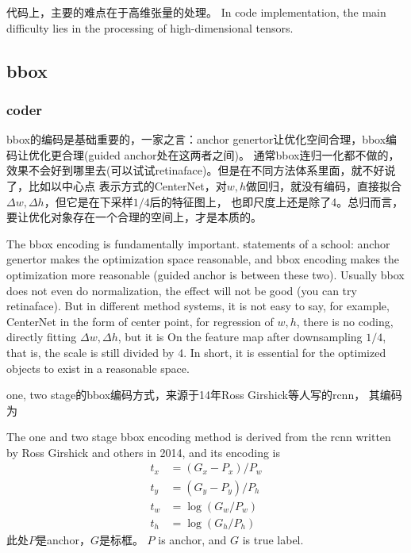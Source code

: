 \documentclass[UTF8]{ctexart}
\begin{document}
代码上，主要的难点在于高维张量的处理。
In code implementation, the main difficulty lies in the processing of high-dimensional tensors.

\subsection{bbox}

\subsubsection{coder}
bbox的编码是基础重要的，一家之言：anchor genertor让优化空间合理，bbox编码让优化更合理(guided anchor处在这两者之间)。
通常bbox连归一化都不做的，效果不会好到哪里去(可以试试retinaface)。但是在不同方法体系里面，就不好说了，比如以中心点
表示方式的CenterNet，对$w, h$做回归，就没有编码，直接拟合$\Delta w, \Delta h$，但它是在下采样$1/4$后的特征图上，
也即尺度上还是除了4。总归而言，要让优化对象存在一个合理的空间上，才是本质的。

The bbox encoding is fundamentally important. statements of a school: anchor genertor makes the optimization space 
reasonable, and bbox encoding makes the optimization more reasonable (guided anchor is between these two). 
Usually bbox does not even do normalization, the effect will not be good (you can try retinaface). 
But in different method systems, it is not easy to say, for example, CenterNet in the form of center point, 
for regression of $w, h$, there is no coding, directly fitting $\Delta w, \Delta h$, but it is On the 
feature map after downsampling $1/4$, that is, the scale is still divided by 4. In short, it is essential 
for the optimized objects to exist in a reasonable space.

one, two stage的bbox编码方式，来源于14年Ross Girshick等人写的rcnn，
其编码为

The one and two stage bbox encoding method is derived from the rcnn written by Ross Girshick and others in 2014, 
and its encoding is
$$
\begin{aligned}
	t_{x} &=\left(G_{x}-P_{x}\right) / P_{w} \label{1} \\
	t_{y} &=\left(G_{y}-P_{y}\right) / P_{h} \label{2}\\
	t_{w} &=\log \left(G_{w} / P_{w}\right)  \label{3}\\
	t_{h} &=\log \left(G_{h} / P_{h}\right)  \label{4}
\end{aligned}
$$
此处$P$是anchor，$G$是标框。
$P$ is anchor, and $G$ is true label.
\end{document}

